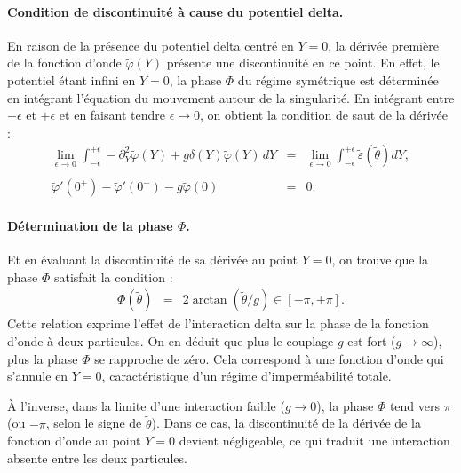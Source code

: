 \paragraph{Condition de discontinuité à cause du potentiel delta.}
En raison de la présence du potentiel delta centré en $Y = 0$, la dérivée première de la fonction d’onde $\tilde{\varphi}(Y)$ présente une discontinuité en ce point. En effet, le potentiel étant infini en $Y = 0$, la phase $\Phi$ du régime symétrique est déterminée en intégrant l’équation du mouvement autour de la singularité. En intégrant entre $- \epsilon$ et $+ \epsilon$ et en faisant tendre $\epsilon \to 0$, on obtient la condition de saut de la dérivée :
\begin{eqnarray*}
	\underset{ \epsilon \to 0 }{\lim} \int_{-\epsilon}^{+\epsilon}  - 	\partial_Y^2\tilde{\varphi}(Y) + g \delta ( Y )\tilde{\varphi}(Y) \, dY  & = & \underset{ \epsilon \to 0 }{\lim}  \int_{-\epsilon}^{+\epsilon}  \tilde{\varepsilon}(\tilde{\theta})d Y ,\\
	\\
	\tilde{\varphi}'(0^+) - \tilde{\varphi}'(0^-) - g \tilde{\varphi} (  0 ) & = & 0 .
\end{eqnarray*}


\paragraph{Détermination de la phase $\Phi$.}
Et en évaluant la discontinuité de sa dérivée au point $Y = 0$, on trouve que la phase $\Phi$ satisfait la condition :
\begin{eqnarray}\label{chap:1:dif.mod.2.part.2}
	\Phi(\tilde{\theta}) & = & 2 \arctan (\tilde{\theta}/g) \in [ - \pi , +\pi ].
\end{eqnarray}
Cette relation exprime l’effet de l’interaction delta sur la phase de la fonction d’onde à deux particules. On en déduit que plus le couplage \( g \) est fort (\( g \to \infty \)), plus la phase \( \Phi \) se rapproche de zéro. Cela correspond à une fonction d’onde qui s’annule en \( Y = 0 \), caractéristique d’un régime d’imperméabilité totale.

À l’inverse, dans la limite d’une interaction faible (\( g \to 0 \)), la phase \( \Phi \) tend vers \( \pi \) (ou \( -\pi \), selon le signe de \( \tilde{\theta} \)). Dans ce cas, la discontinuité de la dérivée de la fonction d’onde au point \( Y = 0 \) devient négligeable, ce qui traduit une interaction absente entre les deux particules.


